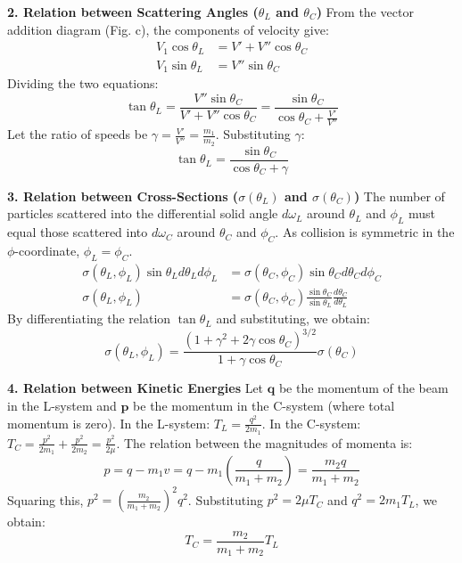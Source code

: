 \documentclass[12pt]{report}
\begin{document}
\textbf{2. Relation between Scattering Angles ($\theta_L$ and $\theta_C$)} From the vector addition diagram (Fig. c), the components of velocity give:
\begin{align*}
V_1 \cos \theta_L &= V' + V'' \cos \theta_C \\
V_1 \sin \theta_L &= V'' \sin \theta_C
\end{align*}
Dividing the two equations:
\begin{equation}
\tan \theta_L = \frac{V'' \sin \theta_C}{V' + V'' \cos \theta_C} = \frac{\sin \theta_C}{\cos \theta_C + \frac{V'}{V''}}
\end{equation}
Let the ratio of speeds be $\gamma = \frac{V'}{V''} = \frac{m_1}{m_2}$. Substituting $\gamma$:
\begin{equation}
\tan \theta_L = \frac{\sin \theta_C}{\cos \theta_C + \gamma}
\end{equation}

\textbf{3. Relation between Cross-Sections ($\sigma(\theta_L)$ and $\sigma(\theta_C)$)} The number of particles scattered into the differential solid angle $d\omega_L$ around $\theta_L$ and $\phi_L$ must equal those scattered into $d\omega_C$ around $\theta_C$ and $\phi_C$. As collision is symmetric in the $\phi$-coordinate, $\phi_L = \phi_C$.
\begin{align*}
\sigma(\theta_L, \phi_L) \sin \theta_L d\theta_L d\phi_L &= \sigma(\theta_C, \phi_C) \sin \theta_C d\theta_C d\phi_C \\
\sigma(\theta_L, \phi_L) &= \sigma(\theta_C, \phi_C) \frac{\sin \theta_C}{\sin \theta_L} \frac{d\theta_C}{d\theta_L}
\end{align*}
By differentiating the relation $\tan \theta_L$ and substituting, we obtain:
\begin{equation}
\sigma(\theta_L, \phi_L) = \frac{(1 + \gamma^2 + 2\gamma \cos \theta_C)^{3/2}}{1 + \gamma \cos \theta_C} \sigma(\theta_C)
\end{equation}

\textbf{4. Relation between Kinetic Energies} Let $\mathbf{q}$ be the momentum of the beam in the L-system and $\mathbf{p}$ be the momentum in the C-system (where total momentum is zero). In the L-system: $T_L = \frac{q^2}{2m_1}$. In the C-system: $T_C = \frac{p^2}{2m_1} + \frac{p^2}{2m_2} = \frac{p^2}{2\mu}$. The relation between the magnitudes of momenta is:
\begin{equation*}
p = q - m_1 v = q - m_1 \left( \frac{q}{m_1 + m_2} \right) = \frac{m_2 q}{m_1 + m_2}
\end{equation*}
Squaring this, $p^2 = \left( \frac{m_2}{m_1 + m_2} \right)^2 q^2$. Substituting $p^2 = 2\mu T_C$ and $q^2 = 2m_1 T_L$, we obtain:
\begin{equation}
T_C = \frac{m_2}{m_1 + m_2} T_L
\end{equation}
\end{document}
